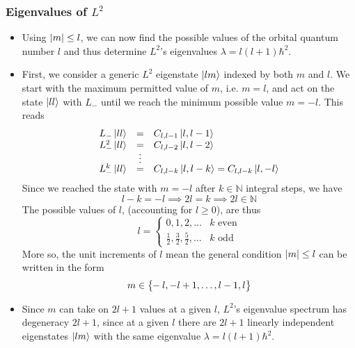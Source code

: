 \documentclass[11pt, a4paper]{article}
\renewcommand{\k}[1]{\ket{#1}}
\begin{document}
\subsubsection{Eigenvalues of $ L^{2} $}
\begin{itemize}
	\item Using $ \abs{m} \leq l $, we can now find the possible values of the orbital quantum number $ l $ and thus determine $ L^{2} $'s eigenvalues $ \lambda = l (l+1)\hbar^{2} $. 
	
	\item First, we consider a generic $ L^{2} $ eigenstate $ \ket{lm} $ indexed by both $ m $ and $ l $. We start with the maximum permitted value of $ m $, i.e. $ m = l $, and act on the state $ \ket{ll} $ with $ L_{-} $ until we reach the minimum possible value $ m = -l $. This reads
	\begin{equation*}
		\begin{array}{lcl}
			L_{-}\k{ll}     & = & C_{l,l-1}\k{l, l-1}\\
			L^{2}_{-}\k{ll} & = & C_{l,l-2}\k{l, l-2}\\[-0.3em]
			& \vdots &\\[-0.3em]
			L^{k}_{-}\k{ll} & = & C_{l,l-k}\k{l, l-k} =  C_{l,l-k}\k{l, -l}\\
		\end{array}
	\end{equation*}
	Since we reached the state with $ m = -l $ after $ k \in \mathbb{N}$ integral steps, we have
	\begin{equation*}
		l - k = - l \implies 2l = k \implies 2l \in \mathbb{N}
	\end{equation*}
	The possible values of $ l $, (accounting for $ l \geq 0 $), are thus
	\begin{equation*}
		l = 
		\begin{cases}
			0, 1, 2, \ldots & k \text{ even}\\
			\frac{1}{2}, \frac{3}{2}, \frac{5}{2}, \ldots & k \text{ odd}
		\end{cases}
	\end{equation*}
	More so, the unit increments of $ l $ mean the general condition $ \abs{m} \leq l $ can be written in the form
	\begin{equation*}
		m \in \big\{\hspace{-0.3em}-l, -l+1, \ldots, l-1, l\big\}
	\end{equation*}
	
	\item Since $ m $ can take on $ 2l + 1 $ values at a given $ l $, $ L^{2} $'s eigenvalue spectrum has degeneracy $ 2l + 1 $, since at a given $ l $ there are $ 2l + 1 $ linearly independent eigenstates $ \ket{lm} $ with the same eigenvalue $ \lambda = l (l+1)\hbar^{2} $. 
	

\end{itemize}
\end{document}
